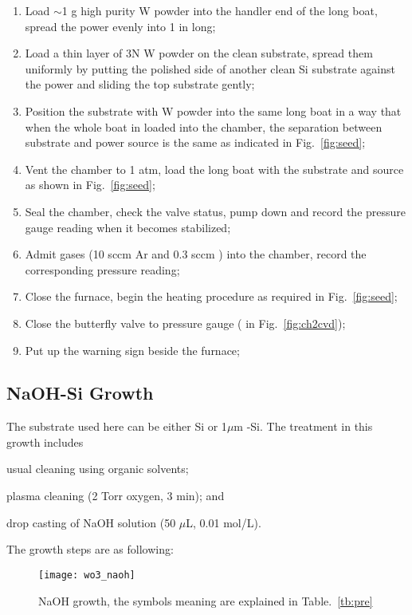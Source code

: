 \begin{enumerate}
\item Load $\sim$1 g high purity W powder into the handler end of the long boat, spread the power evenly into 1 in long;  
\item Load a thin layer of 3N W powder on the clean substrate, spread them uniformly by putting the polished side of another clean Si substrate against the power and sliding the top substrate gently; 
\item Position the substrate with W powder into the same long boat in a way that when the whole boat in loaded into the chamber, the separation between substrate and power source is the same as indicated in Fig.~\ref{fig:seed};
\item Vent the chamber to 1 atm, load the long boat with the substrate and source as shown in Fig.~\ref{fig:seed};
\item Seal the chamber, check the valve status, pump down and record the pressure gauge reading when it becomes stabilized; 
\item Admit gases (10 sccm Ar and 0.3 sccm ) into the chamber, record the corresponding pressure reading;
\item Close the furnace, begin the heating procedure as required in Fig.~\ref{fig:seed}; 
\item Close the butterfly valve to pressure gauge ( in Fig.~\ref{fig:ch2cvd});
\item Put up the warning sign beside the furnace;
\end{enumerate}

\subsection{NaOH-Si Growth}

The substrate used here can be either Si or 1$\mu$m -Si. The treatment in this growth includes \begin{enumerate*}[label=\itshape\alph*\upshape)]
\item usual cleaning using organic solvents;
\item plasma cleaning (2 Torr oxygen, 3 min); and
\item drop casting of NaOH solution (50 $\mu$L, 0.01 mol/L).
\end{enumerate*} The growth steps are as following: 

\begin{figure}[htb]
\centering
\texttt{[image: wo3\_naoh]}
\caption{NaOH  growth, the symbols meaning are explained in Table.~\ref{tb:pre}}
\label{fig:naw}
\end{figure}


